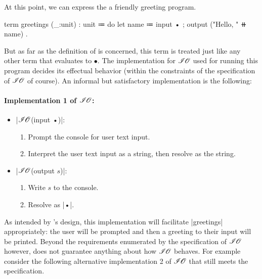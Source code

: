 At this point, we can express the a friendly greeting program.
\begin{snippet}
term greetings (_:unit) : unit
  ≔ do
      { let name ≔ input •
      ; output ("Hello, " ⧺ name) }.
\end{snippet}
But as far as the definition of \LangB is concerned, this term is treated just like any other term that evaluates to $•$.
The implementation for $\mathscr{I\hspace{-0.1em}O}$ used for running this program decides its effectual behavior (within the constraints of the specification of $\mathscr{I\hspace{-0.1em}O}$ of course).
An informal but satisfactory implementation is the following:

\paragraph{Implementation 1 of $\mathscr{I\hspace{-0.1em}O}$:}
\begin{itemize}
  \item \code|$\mathscr{I\hspace{-0.1em}O}$(input •)|:
  \begin{enumerate}
    \item Prompt the console for user text input.
    \item Interpret the user text input as a string, then resolve as the string.
  \end{enumerate}
  \item \code|$\mathscr{I\hspace{-0.1em}O}$(output $s$)|:
  \begin{enumerate}
    \item Write $s$ to the console.
    \item Resolve as \code|•|.
  \end{enumerate}
\end{itemize}
As intended by \LangB's design, this implementation will facilitate \code|greetings| appropriately: the user will be prompted and then a greeting to their input will be printed.
Beyond the requirements enumerated by the specification of $\mathscr{I\hspace{-0.1em}O}$ however, \LangB does not guarantee anything about how $\mathscr{I\hspace{-0.1em}O}$ behaves.
For example consider the following alternative implementation 2 of $\mathscr{I\hspace{-0.1em}O}$ that still meets the specification.

